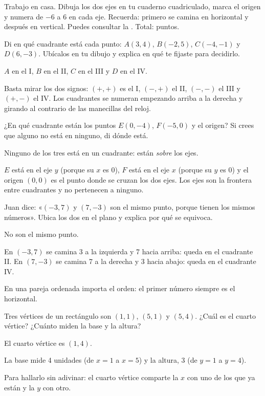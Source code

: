 \documentclass[11pt]{article}
\begin{document}
\encabezado

\begin{instrucciones}
Trabajo en casa. Dibuja los dos ejes en tu cuaderno cuadriculado, marca el origen y numera de
$-6$ a $6$ en cada eje. Recuerda: primero se camina en horizontal y después en vertical.
Puedes consultar la . Total: \totalpuntos{} puntos.
\end{instrucciones}

\begin{preguntas}

\pregunta[1.5] Di en qué cuadrante está cada punto: $A(3, 4)$, $B(-2, 5)$, $C(-4, -1)$ y
$D(6, -3)$. Ubícalos en tu dibujo y explica en qué te fijaste para decidirlo.
\begin{solucion}[4.5cm]
$A$ en el I, $B$ en el II, $C$ en el III y $D$ en el IV.

Basta mirar los dos signos: $(+,+)$ es el I, $(-,+)$ el II, $(-,-)$ el III y $(+,-)$ el IV.
Los cuadrantes se numeran empezando arriba a la derecha y girando al contrario de las
manecillas del reloj.
\end{solucion}

\pregunta[1.5] ¿En qué cuadrante están los puntos $E(0, -4)$, $F(-5, 0)$ y el origen? Si crees
que alguno no está en ninguno, di dónde está.
\begin{solucion}[4.5cm]
Ninguno de los tres está en un cuadrante: están \emph{sobre} los ejes.

$E$ está en el eje $y$ (porque su $x$ es 0), $F$ está en el eje $x$ (porque su $y$ es 0) y el
origen $(0,0)$ es el punto donde se cruzan los dos ejes. Los ejes son la frontera entre
cuadrantes y no pertenecen a ninguno.
\end{solucion}

\pregunta[1] Juan dice: «$(-3, 7)$ y $(7, -3)$ son el mismo punto, porque tienen los mismos
números». Ubica los dos en el plano y explica por qué se equivoca.
\begin{solucion}[4.5cm]
No son el mismo punto.

En $(-3, 7)$ se camina 3 a la izquierda y 7 hacia arriba: queda en el cuadrante II. En
$(7, -3)$ se camina 7 a la derecha y 3 hacia abajo: queda en el cuadrante IV.

En una pareja ordenada importa el orden: el primer número siempre es el horizontal.
\end{solucion}

\pregunta[1] Tres vértices de un rectángulo son $(1, 1)$, $(5, 1)$ y $(5, 4)$. ¿Cuál es el
cuarto vértice? ¿Cuánto miden la base y la altura?
\begin{solucion}[4cm]
El cuarto vértice es $(1, 4)$.

La base mide 4 unidades (de $x = 1$ a $x = 5$) y la altura, 3 (de $y = 1$ a $y = 4$).

Para hallarlo sin adivinar: el cuarto vértice comparte la $x$ con uno de los que ya están y la
$y$ con otro.
\end{solucion}

\end{preguntas}
\end{document}
